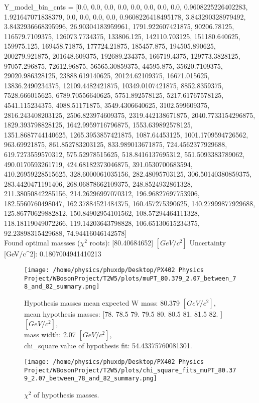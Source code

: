 \documentclass[12pt]{article}
\begin{document}
	Y\_model\_bin\_cnts = [0.0, 0.0, 0.0, 0.0, 0.0, 0.0, 0.0, 0.0, 0.9608225226402283, 1.921647071838379, 0.0, 0.0, 0.0, 0.0, 0.9608226418495178, 3.843290328979492, 3.8432936668395996, 26.90304183959961, 1791.922607421875, 90206.78125, 116579.7109375, 126073.7734375, 133806.125, 142110.703125, 151180.640625, 159975.125, 169458.71875, 177724.21875, 185457.875, 194505.890625, 200279.921875, 201648.609375, 192689.234375, 166719.4375, 129773.3828125, 97057.296875, 72612.96875, 56565.30859375, 44595.875, 35620.7109375, 29020.986328125, 23888.619140625, 20124.62109375, 16671.015625, 13836.2490234375, 12109.4482421875, 10349.0107421875, 8852.8359375, 7528.666015625, 6789.70556640625, 5751.892578125, 5217.61767578125, 4541.115234375, 4088.51171875, 3549.4306640625, 3102.599609375, 2816.243408203125, 2506.823974609375, 2319.442138671875, 2040.7733154296875, 1829.393798828125, 1642.9959716796875, 1553.639892578125, 1351.8687744140625, 1265.3953857421875, 1087.64453125, 1001.1709594726562, 963.69921875, 861.852783203125, 833.989013671875, 724.4562377929688, 619.7273559570312, 575.52978515625, 518.8416137695312, 551.5093383789062, 490.0170593261719, 424.68182373046875, 391.0530700683594, 410.26959228515625, 328.6000061035156, 282.48095703125, 306.50140380859375, 283.4420471191406, 268.06878662109375, 248.8524932861328, 211.38050842285156, 214.26296997070312, 196.96827697753906, 182.5560760498047, 162.37884521484375, 160.457275390625, 140.27999877929688, 125.86770629882812, 150.84902954101562, 108.57294464111328, 118.18119049072266, 119.14203643798828, 106.65130615234375, 92.23898315429688, 74.94416046142578]\\

    Found optimal massses ($\chi^2$ roots): [80.40684652] $[GeV/c^{2}]$
    Uncertainty [GeV/c^2]: 0.1807004941410213

	\begin{figure}[tb]
		\centering
		\texttt{[image: /home/physics/phuxdp/Desktop/PX402 Physics Project/WBosonProject/T2W5/plots/muPT\_80.379\_2.07\_between\_78\_and\_82\_summary.png]}
		\caption{\small Hypothesis masses mean expected W mass: 80.379 $[GeV/c^{2}]$,\\
mean hypothesis masses: [78.  78.5 79.  79.5 80.  80.5 81.  81.5 82. ] $[GeV/c^{2}]$,\\
mass width: 2.07 $[GeV/c^{2}]$,\\
chi_square value of hypothesis fit: 54.43375760081301. }
		\label{fig: fig_0}
	\end{figure}

       \begin{figure}[tb]
		\centering
		\texttt{[image: /home/physics/phuxdp/Desktop/PX402 Physics Project/WBosonProject/T2W5/plots/chi\_square\_fits\_muPT\_80.379\_2.07\_between\_78\_and\_82\_summary.png]}
		\caption{\small $\chi^2$ of hypothesis masses. }
		\label{fig: fig_chi_square}
	\end{figure}
\end{document}
